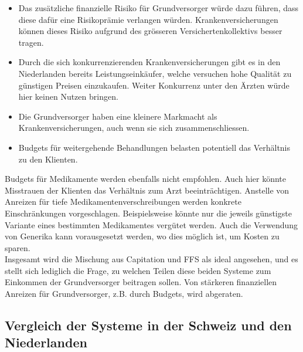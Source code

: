 \documentclass[ngerman,a4paper]{article}
\providecommand{\tightlist}{%
  \setlength{\itemsep}{0pt}\setlength{\parskip}{0pt}}
\begin{document}
\begin{itemize}
\tightlist
\item
  Das zusätzliche finanzielle Risiko für Grundversorger würde dazu
  führen, dass diese dafür eine Risikoprämie verlangen würden.
  Krankenversicherungen können dieses Risiko aufgrund des grösseren
  Versichertenkollektivs besser tragen.
\item
  Durch die sich konkurrenzierenden Krankenversicherungen gibt es in den
  Niederlanden bereits Leistungseinkäufer, welche versuchen hohe
  Qualität zu günstigen Preisen einzukaufen. Weiter Konkurrenz unter den
  Ärzten würde hier keinen Nutzen bringen.
\item
  Die Grundversorger haben eine kleinere Markmacht als
  Krankenversicherungen, auch wenn sie sich zusammenschliessen.
\item
  Budgets für weitergehende Behandlungen belasten potentiell das
  Verhältnis zu den Klienten.
\end{itemize}

Budgets für Medikamente werden ebenfalls nicht empfohlen. Auch hier
könnte Misstrauen der Klienten das Verhältnis zum Arzt beeinträchtigen.
Anstelle von Anreizen für tiefe Medikamentenverschreibungen werden
konkrete Einschränkungen vorgeschlagen. Beispielsweise könnte nur die
jeweils günstigste Variante eines bestimmten Medikamentes vergütet
werden. Auch die Verwendung von Generika kann vorausgesetzt werden, wo
dies möglich ist, um Kosten zu sparen.\\
Insgesamt wird die Mischung aus Capitation und FFS als ideal angesehen,
und es stellt sich lediglich die Frage, zu welchen Teilen diese beiden
Systeme zum Einkommen der Grundversorger beitragen sollen. Von stärkeren
finanziellen Anreizen für Grundversorger, z.B. durch Budgets, wird
abgeraten.

\subsection{Vergleich der Systeme in der Schweiz und den
Niederlanden}\label{vergleich-der-systeme-in-der-schweiz-und-den-niederlanden}
\end{document}
